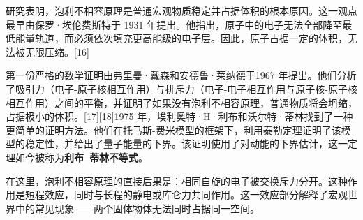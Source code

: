 研究表明，泡利不相容原理是普通宏观物质稳定并占据体积的根本原因。这一观点最早由保罗·埃伦费斯特于 1931 年提出。他指出，原子中的电子无法全部降至最低能量轨道，而必须依次填充更高能级的电子层。因此，原子占据一定的体积，无法被无限压缩。[16]

第一份严格的数学证明由弗里曼·戴森和安德鲁·莱纳德于1967 年提出。他们分析了吸引力（电子-原子核相互作用）与排斥力（电子-电子相互作用与原子核-原子核相互作用）之间的平衡，并证明了如果没有泡利不相容原理，普通物质将会坍缩，占据极小的体积。[17][18]1975 年，埃利奥特·H·利布和沃尔特·蒂林找到了一种更简单的证明方法。他们在托马斯-费米模型的框架下，利用泰勒定理证明了该模型的稳定性，并给出了量子能量的下界。该证明使用了对动能的下界估计，这一定理如今被称为\textbf{利布–蒂林不等式}。

在这里，泡利不相容原理的直接后果是：相同自旋的电子被交换斥力分开。这种作用是短程效应，同时与长程的静电或库仑力共同作用。这一效应部分解释了宏观世界中的常见现象——两个固体物体无法同时占据同一空间。